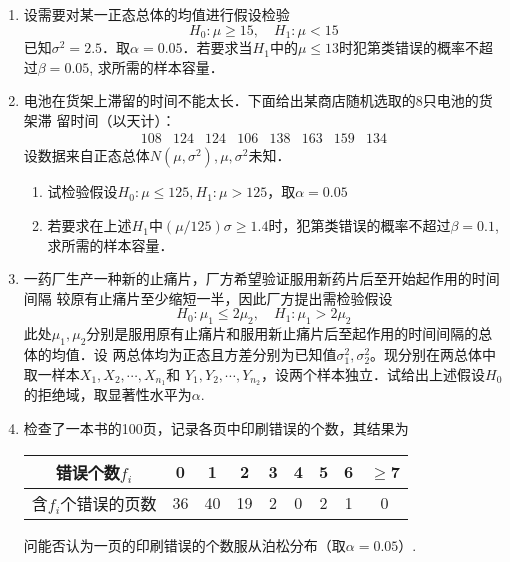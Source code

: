\documentclass[10pt,a4paper]{article}
\begin{document}
\begin{enumerate}
    \item 设需要对某一正态总体的均值进行假设检验
    $$H_0:\mu \geq 15,\quad H_1:\mu <15$$
    已知$\sigma^2=2.5$．取$\alpha=0.05$．若要求当$H_1$中的$\mu\leq 13$时犯第\uppercase\expandafter{}类错误的概率不超过$\beta=0.05$,
    求所需的样本容量．




    \item 电池在货架上滞留的时间不能太长．下面给出某商店随机选取的8只电池的货架滞
    留时间（以天计）：
    $$\begin{array}{cccccccc}
        108 & 124 & 124 & 106 & 138 & 163 & 159 & 134
    \end{array}$$
    设数据来自正态总体$N(\mu,\sigma^2),\mu,\sigma^2$未知．
    \begin{enumerate}
        \item 试检验假设$H_0:\mu \leq 125,H_1:\mu >125$，取$\alpha=0.05$
        \item 若要求在上述$H_1$中$(\mu/125)\sigma\geq 1.4$时，犯第\uppercase\expandafter{}类错误的概率不超过$\beta=0.1$,
        求所需的样本容量．
    \end{enumerate}




    \item 一药厂生产一种新的止痛片，厂方希望验证服用新药片后至开始起作用的时间间隔
    较原有止痛片至少缩短一半，因此厂方提出需检验假设
    $$H_0:\mu_1\leq 2\mu_2,\quad H_1:\mu_1>2\mu_2$$
    此处$\mu_1,\mu_2$分别是服用原有止痛片和服用新止痛片后至起作用的时间间隔的总体的均值．设
    两总体均为正态且方差分别为已知值$\sigma_1^2,\sigma_2^2$。现分别在两总体中取一样本$X_1,X_2,\cdots,X_{n_1}$和
    $Y_1,Y_2,\cdots,Y_{n_2}$，设两个样本独立．试给出上述假设$H_0$的拒绝域，取显著性水平为$\alpha$.




    \item 检查了一本书的100页，记录各页中印刷错误的个数，其结果为
    \renewcommand{\arraystretch}{1.3} 
    \begin{table}[H]\centering
        \begin{tabular}{c|cccccccc}
        错误个数$f_i$    & 0  & 1  & 2  & 3 & 4 & 5 & 6 & $\geq$7 \\ \hline
        含$f_i$个错误的页数 & 36 & 40 & 19 & 2 & 0 & 2 & 1 & 0      
        \end{tabular}
    \end{table}
    \renewcommand{\arraystretch}{1.0} 
    问能否认为一页的印刷错误的个数服从泊松分布（取$\alpha=0.05$）.

    


  

\end{enumerate}
\end{document}
